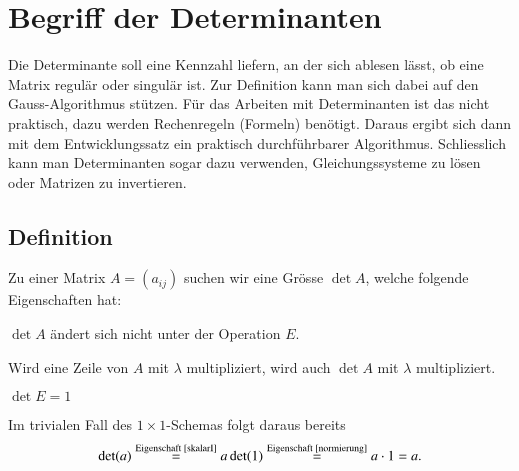 %
%
%
\section{Begriff der Determinanten}
Die Determinante soll eine Kennzahl liefern, an der sich ablesen
lässt, ob eine Matrix regulär oder singulär ist.
Zur Definition kann man sich dabei auf den Gauss-Algorithmus stützen.
Für das
Arbeiten mit Determinanten ist das nicht praktisch, dazu werden
Rechenregeln (Formeln) benötigt.
Daraus ergibt sich dann mit
dem Entwicklungssatz ein praktisch durchführbarer Algorithmus.
Schliesslich kann man Determinanten sogar dazu verwenden, Gleichungssysteme
zu lösen oder Matrizen zu invertieren.
\subsection{Definition}
Zu einer Matrix $A=(a_{ij})$ suchen wir eine Grösse
$\det A$, welche folgende Eigenschaften hat:
\begin{compactenum}
\item $\det A$ ändert sich nicht unter der Operation $E$.\label{invarianzE}
\item Wird eine Zeile von $A$ mit $\lambda$ multipliziert,\label{skalarI}
wird auch $\det A$ mit $\lambda$ multipliziert.
\item $\det E=1$\label{normierung}
\end{compactenum}
Im trivialen Fall des $1\times1$-Schemas folgt daraus bereits
\[
\det(a)\overset{\text{Eigenschaft \ref{skalarI}}}=a\det(1)\overset{\text{Eigenschaft \ref{normierung}}}=a\cdot 1=a.
\]

